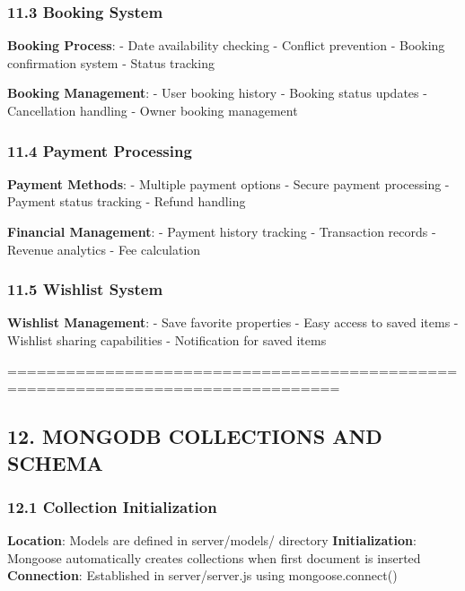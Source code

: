\documentclass[12pt,a4paper]{article}
\begin{document}
\hypertarget{booking-system}{%
\subsubsection{11.3 Booking System}\label{booking-system}}

\textbf{Booking Process}: - Date availability checking - Conflict
prevention - Booking confirmation system - Status tracking

\textbf{Booking Management}: - User booking history - Booking status
updates - Cancellation handling - Owner booking management

\hypertarget{payment-processing-1}{%
\subsubsection{11.4 Payment Processing}\label{payment-processing-1}}

\textbf{Payment Methods}: - Multiple payment options - Secure payment
processing - Payment status tracking - Refund handling

\textbf{Financial Management}: - Payment history tracking - Transaction
records - Revenue analytics - Fee calculation

\hypertarget{wishlist-system}{%
\subsubsection{11.5 Wishlist System}\label{wishlist-system}}

\textbf{Wishlist Management}: - Save favorite properties - Easy access
to saved items - Wishlist sharing capabilities - Notification for saved
items

================================================================================

\hypertarget{mongodb-collections-and-schema}{%
\subsection{12. MONGODB COLLECTIONS AND
SCHEMA}\label{mongodb-collections-and-schema}}

\hypertarget{collection-initialization}{%
\subsubsection{12.1 Collection
Initialization}\label{collection-initialization}}

\textbf{Location}: Models are defined in server/models/ directory
\textbf{Initialization}: Mongoose automatically creates collections when
first document is inserted \textbf{Connection}: Established in
server/server.js using mongoose.connect()
\end{document}
